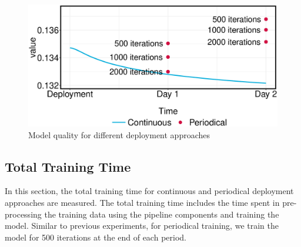 \begin{figure}[h!]
\centering
\includegraphics[width=\columnwidth]{../images/experiment-results/criteo-proactive-training-experiment.eps}
\caption{Model quality for different deployment approaches}
\label{fig:loss-proactive-vs-daily}
\vspace{2mm}
\end{figure}

\subsection{Total Training Time}
In this section, the total training time for continuous and periodical deployment approaches are measured.
The total training time includes the time spent in pre-processing the training data using the pipeline components and training the model.
Similar to previous experiments, for periodical training, we train the model for 500 iterations at the end of each period.

